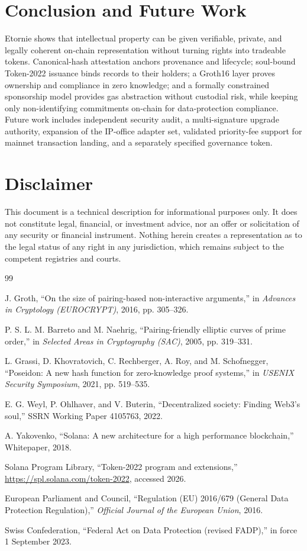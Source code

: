 \documentclass[conference]{IEEEtran}
\begin{document}
\section{Conclusion and Future Work}
\label{sec:conclusion}

Etornie shows that intellectual property can be given verifiable, private,
and legally coherent on-chain representation without turning rights into
tradeable tokens. Canonical-hash attestation anchors provenance and
lifecycle; soul-bound Token-2022 issuance binds records to their holders;
a Groth16 layer proves ownership and compliance in zero knowledge; and a
formally constrained sponsorship model provides gas abstraction without
custodial risk, while keeping only non-identifying commitments on-chain for
data-protection compliance. Future work includes independent security audit,
a multi-signature upgrade authority, expansion of the IP-office adapter set,
validated priority-fee support for mainnet transaction landing, and a
separately specified governance token.

\section*{Disclaimer}
This document is a technical description for informational purposes only. It
does not constitute legal, financial, or investment advice, nor an offer or
solicitation of any security or financial instrument. Nothing herein creates a
representation as to the legal status of any right in any jurisdiction, which
remains subject to the competent registries and courts.

\begin{thebibliography}{99}

J. Groth, ``On the size of pairing-based non-interactive arguments,'' in
\emph{Advances in Cryptology (EUROCRYPT)}, 2016, pp. 305--326.

P. S. L. M. Barreto and M. Naehrig, ``Pairing-friendly elliptic curves of
prime order,'' in \emph{Selected Areas in Cryptography (SAC)}, 2005, pp.
319--331.

L. Grassi, D. Khovratovich, C. Rechberger, A. Roy, and M. Schofnegger,
``Poseidon: A new hash function for zero-knowledge proof systems,'' in
\emph{USENIX Security Symposium}, 2021, pp. 519--535.

E. G. Weyl, P. Ohlhaver, and V. Buterin, ``Decentralized society: Finding
Web3's soul,'' SSRN Working Paper 4105763, 2022.

A. Yakovenko, ``Solana: A new architecture for a high performance
blockchain,'' Whitepaper, 2018.

Solana Program Library, ``Token-2022 program and extensions,''
\url{https://spl.solana.com/token-2022}, accessed 2026.

European Parliament and Council, ``Regulation (EU) 2016/679 (General Data
Protection Regulation),'' \emph{Official Journal of the European Union}, 2016.

Swiss Confederation, ``Federal Act on Data Protection (revised FADP),'' in
force 1 September 2023.

\end{thebibliography}
\end{document}
